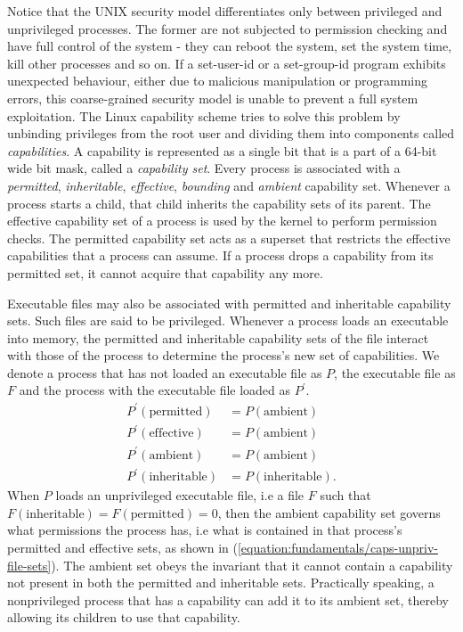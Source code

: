 Notice that the UNIX security model differentiates only between privileged and unprivileged processes.
The former are not subjected to permission checking and have full control of the system - they can 
reboot the system, set the system time, kill other processes and so on. 
If a set-user-id or a set-group-id program exhibits unexpected behaviour, either due to malicious manipulation or 
programming errors, this coarse-grained security model is unable to prevent a full system exploitation.
The Linux capability scheme tries to solve this problem by unbinding privileges from the root 
user and dividing them into components called \textit{capabilities}. A capability is represented as 
a single bit that is a part of a 64-bit wide bit mask, called a \textit{capability set}.
Every process is associated with a \textit{permitted}, \textit{inheritable}, \textit{effective}, 
\textit{bounding} and \textit{ambient} capability set. 
Whenever a process starts a child, that child inherits the capability sets of its parent.
The effective capability set of a process
is used by the kernel to perform permission checks. The permitted capability set acts as a 
superset that restricts the effective capabilities that a process can assume. 
If a process drops a capability from its permitted set, it cannot acquire that capability any more.

Executable files may also be associated with permitted and inheritable capability sets. 
Such files are said to be privileged. 
Whenever a process loads an executable into memory, the permitted and inheritable capability 
sets of the file interact with those of the process to determine the process's new set 
of capabilities. We denote a process that has not loaded an executable file as $P$, the executable 
file as $F$ and the process with the executable file loaded as $P^{\prime}$. 
\begin{align}
    P^{\prime}(\textrm{permitted})   &= P(\textrm{ambient}) \nonumber \\
    P^{\prime}(\textrm{effective})   &= P(\textrm{ambient}) \nonumber \\
    P^{\prime}(\textrm{ambient})     &= P(\textrm{ambient}) \nonumber \\ 
    P^{\prime}(\textrm{inheritable}) &= P(\textrm{inheritable}).
    \label{equation:fundamentals/caps-unpriv-file-sets}
\end{align}
When $P$ loads an unprivileged executable file, i.e a file $F$ such that $F(\textrm{inheritable}) = F(\textrm{permitted}) = 0$,
then the ambient capability set governs what permissions the process has, i.e what is contained 
in that process's permitted and effective sets, as shown in (\ref{equation:fundamentals/caps-unpriv-file-sets}).
The ambient set obeys the invariant that it cannot contain a capability not present in 
both the permitted and inheritable sets. Practically speaking, a nonprivileged process that has a capability 
can add it to its ambient set, thereby allowing its children to use that capability.

